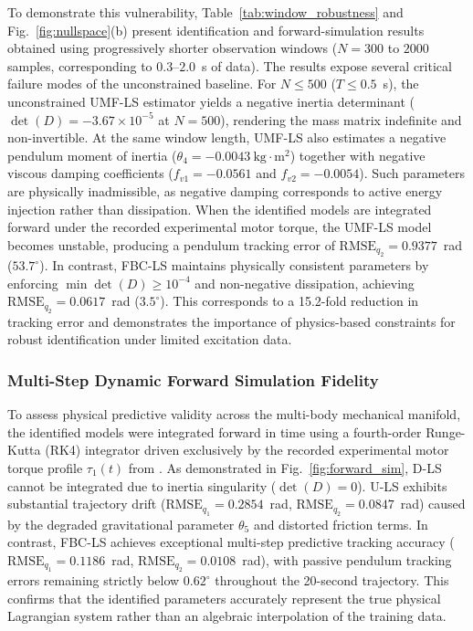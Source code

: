 \documentclass[lettersize,journal]{IEEEtran}
\begin{document}
To demonstrate this vulnerability, Table~\ref{tab:window_robustness} and Fig.~\ref{fig:nullspace}(b) present identification and forward-simulation results obtained using progressively shorter observation windows ($N=300$ to $2000$ samples, corresponding to $0.3$--$2.0$~s of data). The results expose several critical failure modes of the unconstrained baseline. For $N \leq 500$ ($T \leq 0.5$~s), the unconstrained UMF-LS estimator yields a negative inertia determinant ($\det(D) = -3.67 \times 10^{-5}$ at $N=500$), rendering the mass matrix indefinite and non-invertible. At the same window length, UMF-LS also estimates a negative pendulum moment of inertia ($\theta_4 = -0.0043~\text{kg}\cdot\text{m}^2$) together with negative viscous damping coefficients ($f_{v1} = -0.0561$ and $f_{v2} = -0.0054$). Such parameters are physically inadmissible, as negative damping corresponds to active energy injection rather than dissipation. When the identified models are integrated forward under the recorded experimental motor torque, the UMF-LS model becomes unstable, producing a pendulum tracking error of $\text{RMSE}_{q_2} = 0.9377$~rad ($53.7^\circ$). In contrast, FBC-LS maintains physically consistent parameters by enforcing $\min \det(D) \geq 10^{-4}$ and non-negative dissipation, achieving $\text{RMSE}_{q_2} = 0.0617$~rad ($3.5^\circ$). This corresponds to a 15.2-fold reduction in tracking error and demonstrates the importance of physics-based constraints for robust identification under limited excitation data.

\subsubsection{Multi-Step Dynamic Forward Simulation Fidelity}
To assess physical predictive validity across the multi-body mechanical manifold, the identified models were integrated forward in time using a fourth-order Runge-Kutta (RK4) integrator driven exclusively by the recorded experimental motor torque profile $\tau_1(t)$ from \cite{AguilarSierra2014}. As demonstrated in Fig.~\ref{fig:forward_sim}, D-LS cannot be integrated due to inertia singularity ($\det(D) = 0$). U-LS exhibits substantial trajectory drift ($\text{RMSE}_{q_1} = 0.2854$~rad, $\text{RMSE}_{q_2} = 0.0847$~rad) caused by the degraded gravitational parameter $\theta_5$ and distorted friction terms. In contrast, FBC-LS achieves exceptional multi-step predictive tracking accuracy ($\text{RMSE}_{q_1} = 0.1186$~rad, $\text{RMSE}_{q_2} = 0.0108$~rad), with passive pendulum tracking errors remaining strictly below $0.62^\circ$ throughout the 20-second trajectory. This confirms that the identified parameters accurately represent the true physical Lagrangian system rather than an algebraic interpolation of the training data.
\end{document}
